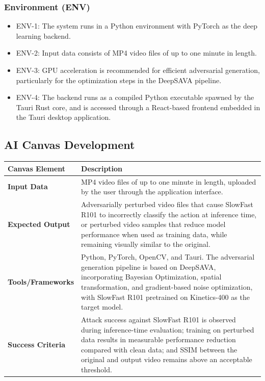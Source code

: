 \subsubsection*{Environment (ENV)}
\begin{itemize}
    \item ENV-1: The system runs in a Python environment 
    with PyTorch as the deep learning backend.
    \item ENV-2: Input data consists of MP4 video files 
    of up to one minute in length.
    \item ENV-3: GPU acceleration is recommended for efficient 
    adversarial generation, particularly for the optimization 
    steps in the DeepSAVA pipeline.
    \item ENV-4: The backend runs as a compiled Python executable 
    spawned by the Tauri Rust core, and is accessed through a 
    React-based frontend embedded in the Tauri desktop application.
\end{itemize}

\subsection{AI Canvas Development}

\begin{table}[H]
\centering
\begin{tabular}{|p{4cm}|p{10cm}|}
\hline
\textbf{Canvas Element} & \textbf{Description} \\
\hline
\textbf{Input Data} & MP4 video files of up to one minute 
in length, uploaded by the user through the application 
interface. \\
\hline
\textbf{Expected Output} & Adversarially perturbed video 
files that cause SlowFast R101 to incorrectly classify the action 
at inference time, or perturbed video samples that reduce 
model performance when used as training data, while 
remaining visually similar to the original. \\
\hline
\textbf{Tools/Frameworks} & Python, PyTorch, OpenCV, and Tauri. 
The adversarial generation pipeline is based on DeepSAVA, 
incorporating Bayesian Optimization, spatial transformation, 
and gradient-based noise optimization, with SlowFast R101 
pretrained on Kinetics-400 as the target model. \\
\hline
\textbf{Success Criteria} & Attack success against SlowFast R101 is 
observed during inference-time evaluation; training on 
perturbed data results in measurable performance reduction 
compared with clean data; and SSIM between the original 
and output video remains above an acceptable threshold. \\
\hline
\end{tabular}
\end{table}


